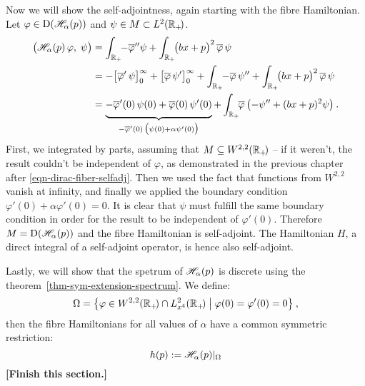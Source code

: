 Now we will show the self-adjointness, again starting with the fibre Hamiltonian. Let $\varphi \in \mathrm{D}(\mathscr{H}_\alpha(p))$ and $\psi \in M \subset L^2(\mathbb{R}_+\!)$.
\begin{align*}
    \big(\Hf_\alpha(p) \, \varphi, \; \psi \big)
    &= \int_{\R_+}\!\! -\overline\varphi'' \psi + \int_{\R_+}\!\! \big(bx + p\big)^2 \, \overline\varphi \, \psi \\
    &= - \big[ \overline\varphi' \, \psi \big]_0^\infty
    + \big[ \overline\varphi \, \psi' \big]_0^\infty
    + \int_{\R_+}\!\! -\overline\varphi \, \psi'' + \int_{\R_+}\!\! \big(bx + p\big)^2 \, \overline\varphi \, \psi \\
    &= \underbrace{
        - \overline\varphi'(0) \, \psi(0)
        + \overline\varphi(0) \, \psi'(0)
        \vphantom{\Big|}
    }_{
        -\overline\varphi'(0) \,
        \big( \psi(0) + \alpha \psi'(0) \big)
    }
    + \int_{\R_+}\!\! \overline\varphi \, \big( {-\psi''} + (bx+p)^2 \psi \big) \: .
\end{align*}
First, we integrated by parts, assuming that $M\subseteq W^{2,2}(\mathbb{R}_+\!)$ ­– if it weren't, the result couldn't be independent of $\varphi$, as demonstrated in the previous chapter after \eqref{eqn-dirac-fiber-selfadj}. Then we used the fact that functions from $W^{2,2}$ vanish at infinity, and finally we applied the boundary condition $\varphi'(0) + \alpha \varphi'(0) = 0$. It is clear that $\psi$ must fulfill the same boundary condition in order for the result to be independent of $\varphi'(0)$. Therefore $M=\mathrm{D}(\mathscr{H}_\alpha(p))$ and the fibre Hamiltonian is self-adjoint. The Hamiltonian $H$, a direct integral of a self-adjoint operator, is hence also self-adjoint.

Lastly, we will show that the spetrum of $\mathscr{H}_\alpha(p)$ is discrete using the theorem~\ref{thm-sym-extension-spectrum}. We define:
\begin{equation*}
    \Omega = \big\{ \varphi \in W^{2,2}(\mathbb{R}_+\!) \cap L^2_{x^4}(\mathbb{R}_+\!) \;\big|\; \varphi(0) = \varphi'(0) = 0 \big\}
    \: ,
\end{equation*}
then the fibre Hamiltonians for all values of $\alpha$ have a common symmetric restriction:
\begin{equation*}
    h(p) := \mathscr{H}_\alpha(p) |_\Omega
\end{equation*}
\textbf{[Finish this section.]}

